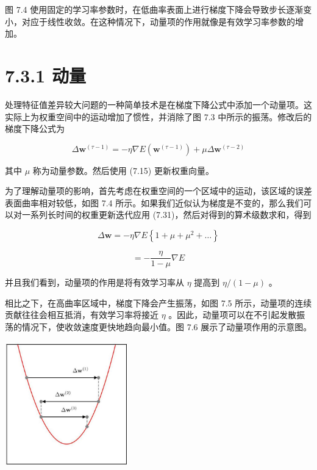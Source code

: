 \documentclass[10pt]{report}
\begin{document}
图 7.4 使用固定的学习率参数时，在低曲率表面上进行梯度下降会导致步长逐渐变小，对应于线性收敛。在这种情况下，动量项的作用就像是有效学习率参数的增加。

\section*{7.3.1 动量}

处理特征值差异较大问题的一种简单技术是在梯度下降公式中添加一个动量项。这实际上为权重空间中的运动增加了惯性，并消除了图 7.3 中所示的振荡。修改后的梯度下降公式为

\[
\Delta {\mathbf{w}}^{\left( \tau  - 1\right) } =  - \eta \nabla E\left( {\mathbf{w}}^{\left( \tau  - 1\right) }\right)  + {\mu \Delta }{\mathbf{w}}^{\left( \tau  - 2\right) } \tag{7.31}
\]

其中 \(\mu\) 称为动量参数。然后使用 (7.15) 更新权重向量。

为了理解动量项的影响，首先考虑在权重空间的一个区域中的运动，该区域的误差表面曲率相对较低，如图 7.4 所示。如果我们近似认为梯度是不变的，那么我们可以对一系列长时间的权重更新迭代应用 (7.31)，然后对得到的算术级数求和，得到

\[
\Delta \mathbf{w} =  - \eta \nabla E\left\{  {1 + \mu  + {\mu }^{2} + \ldots }\right\}   \tag{7.32}
\]

\[
=  - \frac{\eta }{1 - \mu }\nabla E \tag{7.33}
\]

并且我们看到，动量项的作用是将有效学习率从 \(\eta\) 提高到 \(\eta /\left( {1 - \mu }\right)\) 。

相比之下，在高曲率区域中，梯度下降会产生振荡，如图 7.5 所示，动量项的连续贡献往往会相互抵消，有效学习率将接近 \(\eta\) 。因此，动量项可以在不引起发散振荡的情况下，使收敛速度更快地趋向最小值。图 7.6 展示了动量项作用的示意图。

\begin{center}
\includegraphics[max width=0.4\textwidth]{images/0194e279-9b28-703a-88f4-c3ac21e2010d_240_954_347_590_592_0.jpg}
\end{center}
\hspace*{3em} 
\end{document}
